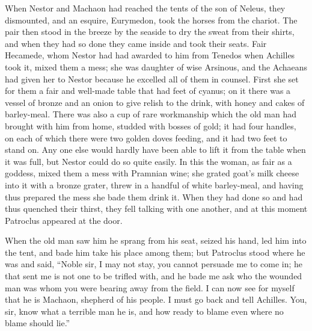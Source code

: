 When Nestor and Machaon had reached the tents of the son of Neleus, they
dismounted, and an esquire, Eurymedon, took the horses from the chariot.
The pair then stood in the breeze by the seaside to dry the sweat from
their shirts, and when they had so done they came inside and took their
seats. Fair Hecamede, whom Nestor had had awarded to him from Tenedos when
Achilles took it, mixed them a mess; she was daughter of wise Arsinous,
and the Achaeans had given her to Nestor because he excelled all of them
in counsel. First she set for them a fair and well-made table that had
feet of cyanus; on it there was a vessel of bronze and an onion to give
relish to the drink, with honey and cakes of barley-meal. There was also a
cup of rare workmanship which the old man had brought with him from home,
studded with bosses of gold; it had four handles, on each of which there
were two golden doves feeding, and it had two feet to stand on. Any one
else would hardly have been able to lift it from the table when it was
full, but Nestor could do so quite easily. In this the woman, as fair as a
goddess, mixed them a mess with Pramnian wine; she grated goat’s milk
cheese into it with a bronze grater, threw in a handful of white
barley-meal, and having thus prepared the mess she bade them drink it.
When they had done so and had thus quenched their thirst, they fell
talking with one another, and at this moment Patroclus appeared at the
door.

When the old man saw him he sprang from his seat, seized his hand, led him
into the tent, and bade him take his place among them; but Patroclus stood
where he was and said, “Noble sir, I may not stay, you cannot persuade me
to come in; he that sent me is not one to be trifled with, and he bade me
ask who the wounded man was whom you were bearing away from the field. I
can now see for myself that he is Machaon, shepherd of his people. I must
go back and tell Achilles. You, sir, know what a terrible man he is, and
how ready to blame even where no blame should lie.”

